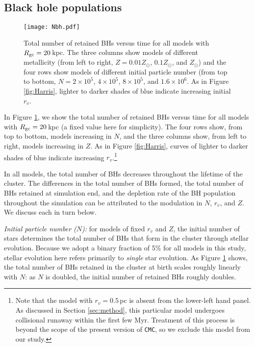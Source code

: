 \documentclass[twocolumn,tighten]{aastex63}
\begin{document}
\subsection{Black hole populations}
\label{sec:BHpopulations}

\begin{figure*}
\begin{center}
\texttt{[image: Nbh.pdf]}
\caption{\footnotesize \label{fig:Nbh} Total number of retained BHs versus time for all models with $R_{\rm{gc}}=20\,$kpc. The three columns show models of different metallicity (from left to right, $Z=0.01Z_{\odot}$, $0.1Z_{\odot}$, and $Z_{\odot}$) and the four rows show models of different initial particle number (from top to bottom, $N=2\times10^5$, $4\times10^5$, $8\times10^5$, and $1.6\times10^6$. As in Figure \ref{fig:Harris}, lighter to darker shades of blue indicate increasing initial $r_v$.}
\end{center}
\end{figure*}

In Figure \ref{fig:Nbh}, we show the total number of retained BHs versus time for all models with $R_{\rm{gc}}=20\,$kpc (a fixed value here for simplicity).
The four rows show, from top to bottom, models increasing in $N$, and the three columns show, from left to right, models increasing in $Z$. As in Figure \ref{fig:Harris}, curves of lighter to darker shades of blue indicate increasing $r_v$.\footnote{Note that the model with $r_v=0.5\,$pc is absent from the lower-left hand panel. As discussed in Section \ref{sec:method}, this particular model undergoes collisional runaway within the first few Myr. Treatment of this process is beyond the scope of the present version of \texttt{CMC}, so we exclude this model from our study.}

In all models, the total number of BHs decreases throughout the lifetime of the cluster. The differences in the total number of BHs formed, the total number of BHs retained at simulation end, and the depletion rate of the BH population throughout the simulation can be attributed to the modulation in $N$, $r_v$, and $Z$. We discuss each in turn below.

\textit{Initial particle number ($N$):} for models of fixed $r_v$ and $Z$, the initial number of stars determines the total number of BHs that form in the cluster through stellar evolution. Because we adopt a binary fraction of 5\% for all models in this study, stellar evolution here refers primarily to \textit{single} star evolution. As Figure \ref{fig:Nbh} shows, the total number of BHs retained in the cluster at birth scales roughly linearly with $N$: as $N$ is doubled, the initial number of retained BHs roughly doubles.
\end{document}
